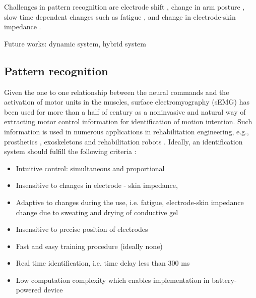 Challenges in pattern recognition are electrode shift \citep{Hargrove2008, Young2011}, change in arm posture \citep{Fougner2011}, slow time dependent changes \citep{Farina2014} such as fatigue \citep{Tkach2010}, and change in electrode-skin impedance \citep{Clancy2002a}.


Future works: dynamic system, hybrid system

\subsection{Pattern recognition}

Given the one to one relationship between the neural commands and the activation of motor units in the muscles, surface electromyography (sEMG) has been used for more than a half of century as a noninvasive and natural way of extracting motor control information for identification of motion intention. Such information is used in numerous applications in rehabilitation engineering, e.g., prosthetics \citep{Li2010, Young2013, Stango2015}, exoskeletons \citep{VacaBenitez2013} and rehabilitation robots \citep{Dipietro2005, Marchal-Crespo2009}.
Ideally, an identification system should fulfill the following criteria \citep{Farina2014}:
\begin{itemize}
\item Intuitive control: simultaneous and proportional
\item Insensitive to changes in electrode - skin impedance,
\item Adaptive to changes during the use, i.e. fatigue, electrode-skin impedance change due to sweating and drying of conductive gel
\item Insensitive to precise position of electrodes
\item Fast and easy training procedure (ideally none)
\item Real time identification, i.e. time delay less than 300 ms \citep{Oskoei2007}
\item Low computation complexity which enables implementation in battery-powered device
\end{itemize}


